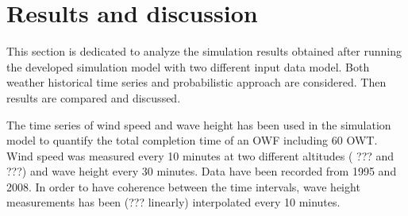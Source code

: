 \section{Results and discussion}
This section is dedicated to analyze the simulation results obtained after running the developed simulation model with two different input data model. Both weather historical time series and probabilistic approach are considered. Then results are compared and discussed.

The time series of wind speed and wave height has been used in the simulation model to quantify the total completion time of an OWF including 60 OWT. Wind speed was measured every 10 minutes at two different altitudes ( ??? and ???) and wave height every 30 minutes. Data have been recorded from 1995 and 2008. In order to have coherence between the time intervals, wave height measurements has been (??? linearly) interpolated every 10 minutes.